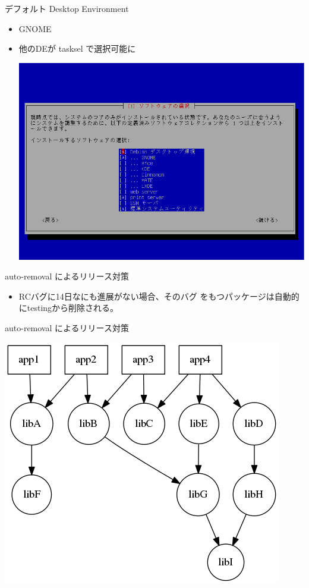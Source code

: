 \begin{frame}{デフォルト Desktop Environment}

\begin{itemize}
\item GNOME
\item 他のDEが tasksel で選択可能に
\begin{center}
\includegraphics[scale=0.3]{image201410/instaler-tasksel.png}
\end{center}

\end{itemize}
\end{frame}

\begin{frame}{auto-removal によるリリース対策}
\begin{itemize}
\item RCバグに14日なにも進展がない場合、そのバグ
をもつパッケージは自動的にtestingから削除される。
\end{itemize}
\end{frame}

\begin{frame}{auto-removal によるリリース対策}
\begin{center}
\includegraphics[scale=0.4]{image201410/auto-rm.png}
\end{center}
\end{frame}

